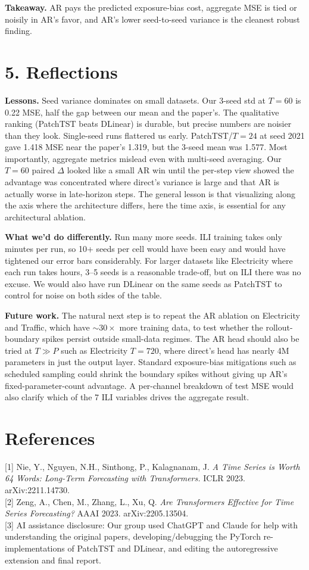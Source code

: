 \documentclass[11pt]{article}
\begin{document}
\textbf{Takeaway.} AR pays the predicted exposure-bias cost, aggregate MSE is tied or noisily in AR's favor, and AR's lower seed-to-seed variance is the cleanest robust finding.

\section*{5. Reflections}
\textbf{Lessons.} Seed variance dominates on small datasets. Our 3-seed std at $T{=}60$ is 0.22 MSE, half the gap between our mean and the paper's. The qualitative ranking (PatchTST beats DLinear) is durable, but precise numbers are noisier than they look. Single-seed runs flattered us early. PatchTST/$T{=}24$ at seed 2021 gave 1.418 MSE near the paper's 1.319, but the 3-seed mean was 1.577. Most importantly, aggregate metrics mislead even with multi-seed averaging. Our $T{=}60$ paired $\Delta$ looked like a small AR win until the per-step view showed the advantage was concentrated where direct's variance is large and that AR is actually worse in late-horizon steps. The general lesson is that visualizing along the axis where the architecture differs, here the time axis, is essential for any architectural ablation.

\textbf{What we'd do differently.} Run many more seeds. ILI training takes only minutes per run, so 10+ seeds per cell would have been easy and would have tightened our error bars considerably. For larger datasets like Electricity where each run takes hours, 3--5 seeds is a reasonable trade-off, but on ILI there was no excuse. We would also have run DLinear on the same seeds as PatchTST to control for noise on both sides of the table.

\textbf{Future work.} The natural next step is to repeat the AR ablation on Electricity and Traffic, which have $\sim 30\times$ more training data, to test whether the rollout-boundary spikes persist outside small-data regimes. The AR head should also be tried at $T \gg P$ such as Electricity $T{=}720$, where direct's head has nearly 4M parameters in just the output layer. Standard exposure-bias mitigations such as scheduled sampling could shrink the boundary spikes without giving up AR's fixed-parameter-count advantage. A per-channel breakdown of test MSE would also clarify which of the 7 ILI variables drives the aggregate result.

\section*{References}
\small
[1] Nie, Y., Nguyen, N.H., Sinthong, P., Kalagnanam, J. \textit{A Time Series is Worth 64 Words: Long-Term Forecasting with Transformers.} ICLR 2023. arXiv:2211.14730. \\

[2] Zeng, A., Chen, M., Zhang, L., Xu, Q. \textit{Are Transformers Effective for Time Series Forecasting?} AAAI 2023. arXiv:2205.13504. \\

[3] AI assistance disclosure: Our group used ChatGPT and Claude for help with understanding the original papers, developing/debugging the PyTorch re-implementations of PatchTST and DLinear, and editing the autoregressive extension and final report.
\end{document}

